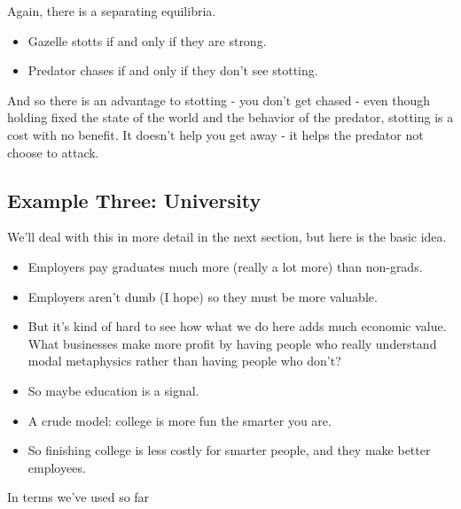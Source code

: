 \documentclass[
  11pt,
]{article}
\providecommand{\tightlist}{%
  \setlength{\itemsep}{0pt}\setlength{\parskip}{0pt}}
\begin{document}
Again, there is a separating equilibria.

\begin{itemize}
\tightlist
\item
  Gazelle stotts if and only if they are strong.
\item
  Predator chases if and only if they don't see stotting.
\end{itemize}

And so there is an advantage to stotting - you don't get chased - even
though holding fixed the state of the world and the behavior of the
predator, stotting is a cost with no benefit. It doesn't help you get
away - it helps the predator not choose to attack.

\hypertarget{example-three-university}{%
\subsection{Example Three: University}\label{example-three-university}}

We'll deal with this in more detail in the next section, but here is the
basic idea.

\begin{itemize}
\tightlist
\item
  Employers pay graduates much more (really a lot more) than non-grads.
\item
  Employers aren't dumb (I hope) so they must be more valuable.
\item
  But it's kind of hard to see how what we do here adds much economic
  value. What businesses make more profit by having people who really
  understand modal metaphysics rather than having people who don't?
\item
  So maybe education is a signal.
\item
  A crude model: college is more fun the smarter you are.
\item
  So finishing college is less costly for smarter people, and they make
  better employees.
\end{itemize}

In terms we've used so far
\end{document}
